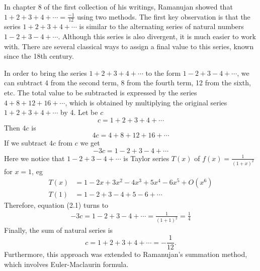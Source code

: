In chapter 8 of the first collection of his writings, Ramanujan showed that $1+2+3+4+\cdots = \frac{-1}{12}$ using two
methods.
The first key observation is that the series $1+2+3+4+\cdots$ is similar to the alternating series of natural
numbers $1-2+3-4+\cdots$.
Although this series is also divergent, it is much easier to work with.
There are several classical ways to assign a final value to this series, known since the 18th century.

In order to bring the series $1+2+3+4+\cdots$ to the form $1-2+3-4+\cdots$, we can subtract 4 from the second
term, 8 from the fourth term, 12 from the sixth, etc.
The total value to be subtracted is expressed by the series $4+8+12+16+\cdots$, which is obtained by multiplying the
original series $1+2+3+4+\cdots$ by 4.
Let be $c$
\begin{equation*}
    c = 1+2+3+4+\cdots
\end{equation*}
Then $4c$ is
\begin{equation*}
    4c = 4+8+12+16+\cdots
\end{equation*}
If we subtract $4c$ from $c$ we get
\begin{equation}
    -3c = 1-2+3-4+\cdots\label{eq:equation2}
\end{equation}
Here we notice that $1-2+3-4+\cdots$ is Taylor series $T(x)$ of $f(x) = \frac{1}{(1+x)^2}$ for $x=1$, eg
\begin{align*}
    T(x) &= 1 - 2x + 3x^2 - 4x^3 + 5x^4 - 6x^5 + O(x^6) \\
    T(1) &= 1 - 2 + 3 - 4 + 5 - 6 + \cdots
\end{align*}
Therefore, equation (2.1) turns to
\begin{align*}
    -3c = 1-2+3-4+\cdots = \frac{1}{(1 + 1)^2} = \frac{1}{4}
\end{align*}
Finally, the sum of natural series is
\begin{equation*}
    c = 1+2+3+4+\cdots = -\frac{1}{12}.
\end{equation*}
Furthermore, this approach was extended to Ramanujan's summation method, which involves Euler-Maclaurin formula.